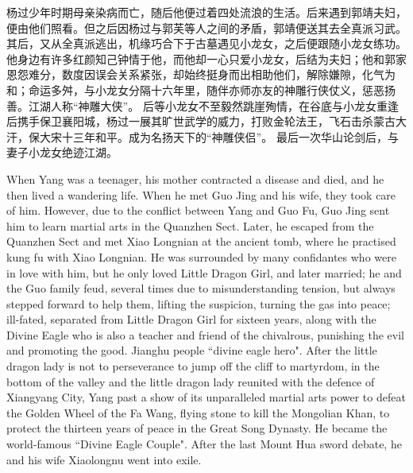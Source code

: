 \documentclass[print, doctor, vlined]{DissertUESTC}
\begin{document}
	\zhabstract
	
	杨过少年时期母亲染病而亡，随后他便过着四处流浪的生活。后来遇到郭靖夫妇，便由他们照看。但之后因杨过与郭芙等人之间的矛盾，郭靖便送其去全真派习武。其后，又从全真派逃出，机缘巧合下于古墓遇见小龙女，之后便跟随小龙女练功。 他身边有许多红颜知己钟情于他，而他却一心只爱小龙女，后结为夫妇；他和郭家恩怨难分，数度因误会关系紧张，却始终挺身而出相助他们，解除嫌隙，化气为和；命运多舛，与小龙女分隔十六年里，随伴亦师亦友的神雕行侠仗义，惩恶扬善。江湖人称“神雕大侠”。 后等小龙女不至毅然跳崖殉情，在谷底与小龙女重逢后携手保卫襄阳城，杨过一展其旷世武学的威力，打败金轮法王，飞石击杀蒙古大汗，保大宋十三年和平。成为名扬天下的“神雕侠侣”。 最后一次华山论剑后，与妻子小龙女绝迹江湖。
	


	
	
	\enabstract
	
	When Yang was a teenager, his mother contracted a disease and died, and he then lived a wandering life. When he met Guo Jing and his wife, they took care of him. However, due to the conflict between Yang and Guo Fu, Guo Jing sent him to learn martial arts in the Quanzhen Sect. Later, he escaped from the Quanzhen Sect and met Xiao Longnian at the ancient tomb, where he practised kung fu with Xiao Longnian. He was surrounded by many confidantes who were in love with him, but he only loved Little Dragon Girl, and later married; he and the Guo family feud, several times due to misunderstanding tension, but always stepped forward to help them, lifting the suspicion, turning the gas into peace; ill-fated, separated from Little Dragon Girl for sixteen years, along with the Divine Eagle who is also a teacher and friend of the chivalrous, punishing the evil and promoting the good. Jianghu people ``divine eagle hero". After the little dragon lady is not to perseverance to jump off the cliff to martyrdom, in the bottom of the valley and the little dragon lady reunited with the defence of Xiangyang City, Yang past a show of its unparalleled martial arts power to defeat the Golden Wheel of the Fa Wang, flying stone to kill the Mongolian Khan, to protect the thirteen years of peace in the Great Song Dynasty. He became the world-famous ``Divine Eagle Couple". After the last Mount Hua sword debate, he and his wife Xiaolongnu went into exile.
	
\end{document}
